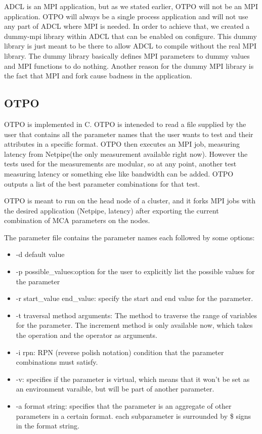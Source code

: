 ADCL is an MPI application, but as we stated earlier, OTPO will not be an MPI
application. OTPO will always be a single process application and will not use
any part of ADCL where MPI is needed. In order to achieve that, we created a
dummy-mpi library within ADCL that can be enabled on configure. This dummy
library is just meant to be there to allow ADCL to compile without the real
MPI library. The dummy library basically defines MPI parameters to dummy
values and MPI functions to do nothing. Another reason for the dummy MPI
library is the fact that MPI and fork cause badness in the application.

\subsection{OTPO}
OTPO is implemented in C. OTPO is inteneded to read a file supplied by the
user that contains all the parameter names that the user wants to test and
their attributes in a specific format. OTPO then executes an MPI job,
measuring latency from Netpipe\cite{netpipe}(the only measurement available
right now). However the tests used for the measurements are modular, so at any
point, another test measuring latency or something else like bandwidth can be
added. OTPO outputs a list of the best parameter combinations for that test.

OTPO is meant to run on the head node of a cluster, and it forks MPI jobs with
the desired application (Netpipe, latency) after exporting the current
combination of MCA parameters on the nodes.

The parameter file contains the parameter names each followed by some options:
\begin{itemize}
\item -d default value
\item -p {possible\_values}:option for the user to explicitly list the possible
  values for the parameter
\item -r start\_value end\_value: specify the start and end value for the
  parameter.
\item -t traversal method arguments: The method to traverse the range of
  variables for the parameter. The increment method is only available now,
  which takes the operation and the operator as arguments.
\item -i rpn: RPN (reverse polish notation) condition that the parameter
  combinations must satisfy.
\item -v: specifies if the parameter is virtual, which means that it won't be
  set as an environment varaible, but will be part of another parameter.
\item -a {format string}: specifies that the parameter is an aggregate of
  other parameters in a certain format. each subparameter is surrounded by \$
  signs in the format string.
\end{itemize}

